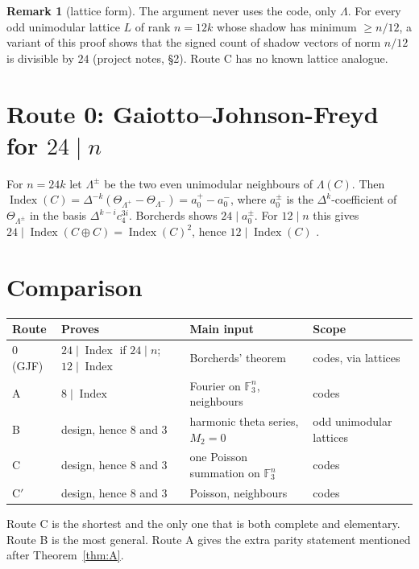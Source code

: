\documentclass[11pt]{amsart}
\theoremstyle{definition}
\newtheorem{remark}[theorem]{Remark}
\newcommand{\F}{\mathbb{F}_3}
\newcommand{\Index}{\operatorname{Index}}
\begin{document}
\begin{remark}[lattice form]
The argument never uses the code, only $\Lambda$. For every odd unimodular lattice $L$ of rank
$n=12k$ whose shadow has minimum $\ge n/12$, a variant of this proof shows that the signed count of
shadow vectors of norm $n/12$ is divisible by $24$ (project notes, \S2). Route C has no known lattice
analogue.
\end{remark}

\section{Route 0: Gaiotto--Johnson-Freyd for \texorpdfstring{$24\mid n$}{24 | n}}\label{sec:gjf}

For $n=24k$ let $\Lambda^\pm$ be the two even unimodular neighbours of $\Lambda(C)$. Then
$\Index(C)=\Delta^{-k}(\Theta_{\Lambda^+}-\Theta_{\Lambda^-})=a_0^+-a_0^-$, where $a_0^\pm$ is the
$\Delta^k$-coefficient of $\Theta_{\Lambda^\pm}$ in the basis $\Delta^{k-i}c_4^{3i}$. Borcherds
\cite[Thm.~12.1]{Bo} shows $24\mid a_0^\pm$. For $12\mid n$ this gives $24\mid\Index(C\oplus C)
=\Index(C)^2$, hence $12\mid\Index(C)$ \cite[\S1]{GJF}.

\section{Comparison}\label{sec:compare}

\begin{center}
\small
\begin{tabular}{@{}llll@{}}
\toprule
Route & Proves & Main input & Scope\\
\midrule
0 (GJF) & $24\mid\Index$ if $24\mid n$; $12\mid\Index$ & Borcherds' theorem & codes, via lattices\\
A & $8\mid\Index$ & Fourier on $\F^n$, neighbours & codes\\
B & design, hence $8$ and $3$ & harmonic theta series, $M_2=0$ & odd unimodular lattices\\
C & design, hence $8$ and $3$ & one Poisson summation on $\F^n$ & codes\\
C$'$ & design, hence $8$ and $3$ & Poisson, neighbours & codes\\
\bottomrule
\end{tabular}
\end{center}

Route C is the shortest and the only one that is both complete and elementary. Route B is the most
general. Route A gives the extra parity statement mentioned after Theorem~\ref{thm:A}.
\end{document}
